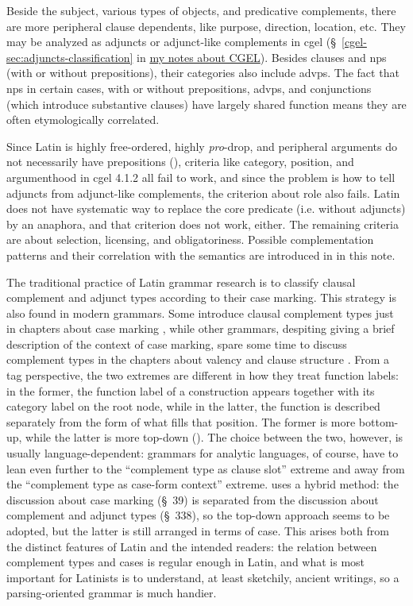 \documentclass{article}
\newcommand*{\citesec}[1]{\S~{#1}}
\newcommand*{\citechap}[1]{chap.~{#1}}
\newcommand*{\term}[1]{\emph{#1}}
\newcommand{\cgel}{\href{../English/cambridge.pdf}{my notes about CGEL}}
\begin{document}
Beside the subject, various types of objects, and predicative complements,
there are more peripheral clause dependents,
like purpose, direction, location, etc.
They may be analyzed as adjuncts or adjunct-like complements in 
\ac{cgel} (\citesec{\ref{cgel-sec:adjuncts-classification}} in \cgel).
Besides clauses and \ac{np}s (with or without prepositions),
their categories also include \ac{advp}s.
The fact that \ac{np}s in certain cases, with or without prepositions,
\ac{advp}s, and conjunctions (which introduce substantive clauses)
have largely shared function 
means they are often etymologically correlated.

Since Latin is highly free-ordered, 
highly \term{pro}-drop,
and peripheral arguments do not necessarily have prepositions (),
criteria like category, position, and argumenthood in \ac{cgel} 4.1.2
all fail to work,
and since the problem is how to tell adjuncts from adjunct-like complements,
the criterion about role also fails.
Latin does not have systematic way to replace the core predicate (i.e. without adjuncts) by an anaphora,
and that criterion does not work, either.
The remaining criteria are about selection, licensing, and obligatoriness.
Possible complementation patterns and their correlation with the semantics 
are introduced in  in this note.

The traditional practice of Latin grammar research
is to classify clausal complement and adjunct types according to their case marking.
This strategy is also found in modern grammars.
Some introduce clausal complement types just in chapters about case marking 
\citep[\citechap{8}]{jacques2021grammar},
while other grammars, despiting giving a brief description of the context of case marking,
spare some time to discuss complement types in the chapters about valency and clause structure 
\citep[\citesec{3.4}, \citechap{19}, \citechap{22}]{forker2020grammar}.
From a \ac{tag} perspective, 
the two extremes are different in how they treat function labels:
in the former, the function label of a construction appears together with its category label on the root node,
while in the latter, the function is described separately from the form of what fills that position.
The former is more bottom-up, 
while the latter is more top-down ().
The choice between the two, however, is usually language-dependent:
grammars for analytic languages, of course, have to lean even further to the 
``complement type as clause slot'' extreme 
and away from the ``complement type as case-form context'' extreme.
\citet{allen1903allen} uses a hybrid method:
the discussion about case marking (\citesec{39}) is separated from 
the discussion about complement and adjunct types (\citesec{338}),
so the top-down approach seems to be adopted,
but the latter is still arranged in terms of case.
This arises both from the distinct features of Latin and the intended readers:
the relation between complement types and cases is regular enough in Latin,
and what is most important for Latinists is to understand, at least sketchily, ancient writings, 
so a parsing-oriented grammar is much handier.
\end{document}
